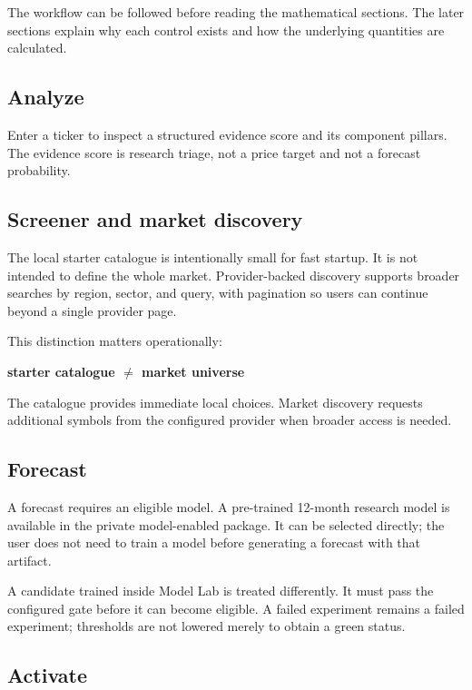 \documentclass[11pt]{article}
\begin{document}
The workflow can be followed before reading the mathematical sections. The later sections explain why each control exists and how the underlying quantities are calculated.

\subsection{Analyze}

Enter a ticker to inspect a structured evidence score and its component pillars. The evidence score is research triage, not a price target and not a forecast probability.

\subsection{Screener and market discovery}

The local starter catalogue is intentionally small for fast startup. It is not intended to define the whole market. Provider-backed discovery supports broader searches by region, sector, and query, with pagination so users can continue beyond a single provider page.

This distinction matters operationally:

\begin{center}
\textbf{starter catalogue $\neq$ market universe}
\end{center}

The catalogue provides immediate local choices. Market discovery requests additional symbols from the configured provider when broader access is needed.

\subsection{Forecast}

A forecast requires an eligible model. A pre-trained 12-month research model is available in the private model-enabled package. It can be selected directly; the user does not need to train a model before generating a forecast with that artifact.

A candidate trained inside Model Lab is treated differently. It must pass the configured gate before it can become eligible. A failed experiment remains a failed experiment; thresholds are not lowered merely to obtain a green status.

\subsection{Activate}
\end{document}
